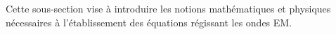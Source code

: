 Cette sous-section vise à introduire les notions mathématiques et physiques nécessaires à l'établissement des équations régissant les ondes EM. 
%		
%			
%			
%			
%			
%			
%			
%			
%			
%			
%			
%			
%			
%			
%			
%			
%			
%		
